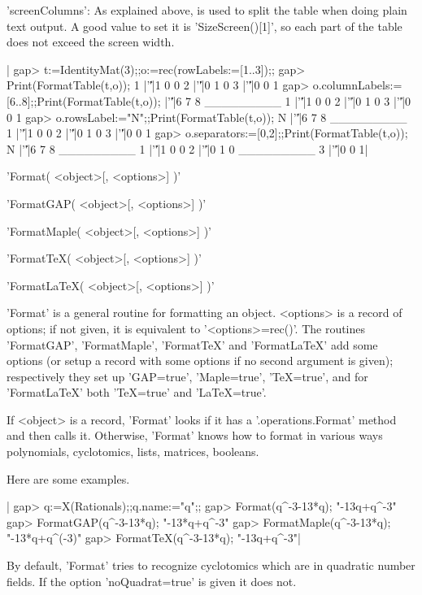 'screenColumns':  As explained above, is used to split the table when doing
plain  text output. A  good value to  set it is  'SizeScreen()[1]', so each
part of the table does not exceed the screen width.

|    gap> t:=IdentityMat(3);;o:=rec(rowLabels:=[1..3]);;
    gap> Print(FormatTable(t,o));
    1 |'\|'|1 0 0
    2 |'\|'|0 1 0
    3 |'\|'|0 0 1
    gap> o.columnLabels:=[6..8];;Print(FormatTable(t,o));
      |'\|'|6 7 8
    _________
    1 |'\|'|1 0 0
    2 |'\|'|0 1 0
    3 |'\|'|0 0 1
    gap> o.rowsLabel:="N";;Print(FormatTable(t,o));
    N |'\|'|6 7 8
    _________
    1 |'\|'|1 0 0
    2 |'\|'|0 1 0
    3 |'\|'|0 0 1
    gap> o.separators:=[0,2];;Print(FormatTable(t,o));
    N |'\|'|6 7 8
    _________
    1 |'\|'|1 0 0
    2 |'\|'|0 1 0
    _________
    3 |'\|'|0 0 1|

%
%

'Format( <object>[, <options>] )'

%
'FormatGAP( <object>[, <options>] )'

%
'FormatMaple( <object>[, <options>] )'

%
'FormatTeX( <object>[, <options>] )'

%
'FormatLaTeX( <object>[, <options>] )'

'Format'  is a  general routine  for formatting  an object.  <options> is a
record  of options; if not given,  it is equivalent to '<options>\:=rec()'.
The  routines 'FormatGAP', 'FormatMaple', 'FormatTeX' and 'FormatLaTeX' add
some  options (or setup a record with some options if no second argument is
given);    respectively   they   set   up   'GAP\:=true',   'Maple\:=true',
'TeX\:=true', and for 'FormatLaTeX' both 'TeX\:=true' and 'LaTeX\:=true'.

If  <object> is a  record, 'Format' looks  if it has a '.operations.Format'
method  and  then  calls  it.  Otherwise,  'Format'  knows how to format in
various ways\: polynomials, cyclotomics, lists, matrices, booleans.

Here are some examples.

|    gap> q:=X(Rationals);;q.name:="q";;
    gap> Format(q^-3-13*q);
    "-13q+q^-3"
    gap> FormatGAP(q^-3-13*q);
    "-13*q+q^-3"
    gap> FormatMaple(q^-3-13*q);
    "-13*q+q^(-3)"
    gap> FormatTeX(q^-3-13*q);
    "-13q+q^{-3}"|

By default, 'Format' tries to recognize cyclotomics which are in quadratic
number fields. If the option 'noQuadrat\:=true' is given it does not.

